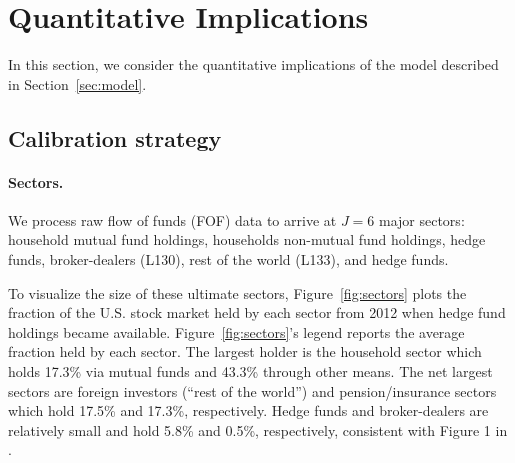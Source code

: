 



\section{Quantitative Implications}

In this section, we consider the quantitative implications of the model described in Section~\ref{sec:model}. 

 
\subsection{Calibration strategy}
\paragraph{Sectors.}
We process raw flow of funds (FOF) data to arrive at $J=6$ major sectors: household mutual fund holdings, households non-mutual fund holdings, hedge funds, broker-dealers (L130), rest of the world (L133), and hedge funds. 

To visualize the size of these ultimate sectors, Figure~\ref{fig:sectors} plots the fraction of the U.S. stock market held by each sector from 2012 when hedge fund holdings became available. Figure~\ref{fig:sectors}'s legend reports the average fraction held by each sector. The largest holder is the household sector which holds 17.3\% via mutual funds and 43.3\% through other means. The net largest sectors are foreign investors (``rest of the world'') and pension/insurance sectors which hold 17.5\% and 17.3\%, respectively. Hedge funds and broker-dealers are relatively small and hold 5.8\% and 0.5\%, respectively, consistent with Figure 1 in \cite{koijen2024investors}. 


